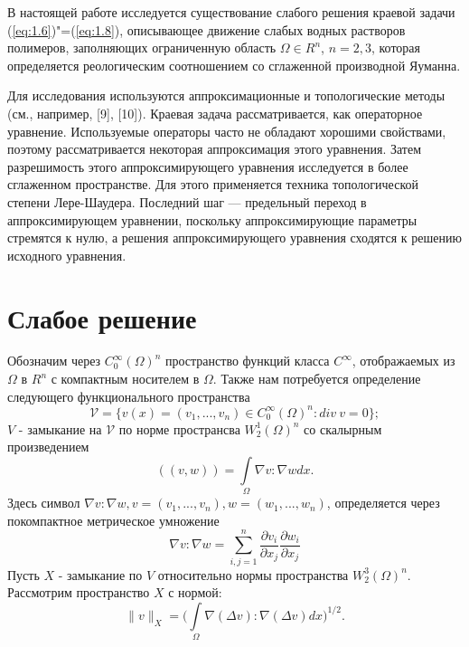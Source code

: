 В настоящей работе исследуется существование слабого решения краевой задачи (\ref{eq:1.6})"=(\ref{eq:1.8}), описывающее движение слабых
водных растворов полимеров, заполняющих ограниченную область $\Omega \in R^n$, $n = 2,3$, которая определяется реологическим
соотношением со сглаженной производной Яуманна.

Для исследования используются аппроксимационные и топологические методы (см., например, [9], [10]). 
Краевая задача рассматривается, как операторное уравнение. Используемые операторы часто не
обладают хорошими свойствами, поэтому рассматривается некоторая аппроксимация этого уравнения. Затем разрешимость
этого аппроксимирующего уравнения исследуется в более сглаженном пространстве. Для этого применяется техника
топологической степени Лере-Шаудера. Последний шаг --- предельный переход  в аппроксимирующем уравнении, поскольку
аппроксимирующие параметры стремятся к нулю, а решения аппроксимирующего уравнения сходятся к решению исходного
уравнения.


\section{Слабое решение}

Обозначим через $C_0^{\infty}(\Omega)^n$ пространство функций класса $C^{\infty}$, отображаемых из $\Omega$ в $R^n$ с
компактным носителем в $\Omega$. Также нам потребуется определение следующего функционального пространства
$$\mathcal{V}=\{v(x)=(v_1,...,v_n)\in C_0^{\infty}(\Omega)^n: div \ v = 0\};$$
$V$ - замыкание на $\mathcal{V}$ по норме пространсва $W^1_2(\Omega)^n$
со скалырным произведением
$$((v,w))=\int\limits_{\Omega}\nabla v : \nabla w dx.$$
Здесь символ $\nabla v : \nabla w, v=(v_1,...,v_n), w=(w_1,...,w_n)$, определяется через покомпактное метрическое умножение
$$\nabla v : \nabla w = \sum_{i,j=1}^n \frac{\partial v_i}{\partial x_j}\frac{\partial w_i}{\partial x_j} $$
Пусть $X$ - замыкание по $V$ относительно нормы пространства $W_2^3(\Omega)^n$. Рассмотрим пространство $X$ с нормой:
$$\parallel v\parallel_{X}=\bigg(\int\limits_{\Omega}\nabla(\Delta v):\nabla(\Delta v)dx\bigg)^{1/2}.$$

